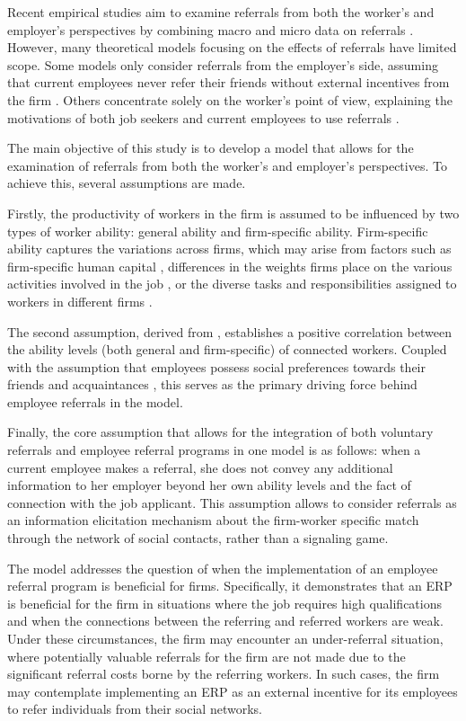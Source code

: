 \documentclass[12pt]{article}
\begin{document}
Recent empirical studies aim to examine referrals from both the worker's and employer's perspectives by combining macro and micro data on referrals \citep{levati2020impact, lester2021heterogeneous}. However, many theoretical models focusing on the effects of referrals have limited scope. Some models only consider referrals from the employer's side, assuming that current employees never refer their friends without external incentives from the firm \citep{ekinci2016employee}. Others concentrate solely on the worker's point of view, explaining the motivations of both job seekers and current employees to use referrals \citep{lester2021heterogeneous}.

The main objective of this study is to develop a model that allows for the examination of referrals from both the worker's and employer's perspectives. To achieve this, several assumptions are made. 

Firstly, the productivity of workers in the firm is assumed to be influenced by two types of worker ability: general ability and firm-specific ability. Firm-specific ability captures the variations across firms, which may arise from factors such as firm-specific human capital \citep{becker1962investment, becker1975investment}, differences in the weights firms place on the various activities involved in the job \citep{lazear2009firm}, or the diverse tasks and responsibilities assigned to workers in different firms \citep{gibbons2004task}.

The second assumption, derived from \cite{montgomery1991social}, establishes a positive correlation between the ability levels (both general and firm-specific) of connected workers. Coupled with the assumption that employees possess social preferences towards their friends and acquaintances \citep{bandiera2009social, friebel2023employee}, this serves as the primary driving force behind employee referrals in the model.

Finally, the core assumption that allows for the integration of both voluntary referrals and employee referral programs in one model is as follows: when a current employee makes a referral, she does not convey any additional information to her employer beyond her own ability levels and the fact of connection with the job applicant. This assumption allows to consider referrals as an information elicitation mechanism about the firm-worker specific match through the network of social contacts, rather than a signaling game.

The model addresses the question of when the implementation of an employee referral program is beneficial for firms. Specifically, it demonstrates that an ERP is beneficial for the firm in situations where the job requires high qualifications and when the connections between the referring and referred workers are weak. Under these circumstances, the firm may encounter an under-referral situation, where potentially valuable referrals for the firm are not made due to the significant referral costs borne by the referring workers. In such cases, the firm may contemplate implementing an ERP as an external incentive for its employees to refer individuals from their social networks.
\end{document}
